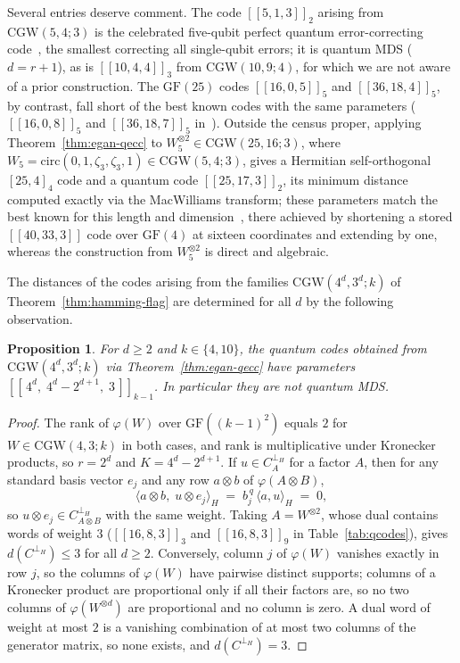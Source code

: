 \documentclass{article}
\newtheorem{proposition}[theorem]{Proposition}
\theoremstyle{definition}
\theoremstyle{remark}
\newcommand{\CGW}{\mathrm{CGW}}
\newcommand{\GF}{\mathrm{GF}}
\begin{document}
Several entries deserve comment.  The code $[[5,1,3]]_2$ arising from
$\CGW(5,4;3)$ is the celebrated five-qubit perfect quantum
error-correcting code~\cite{CGW-Survey}, the smallest correcting all
single-qubit errors; it is quantum MDS ($d = r+1$), as is $[[10,4,4]]_3$
from $\CGW(10,9;4)$, for which we are not aware of a prior construction.
The $\GF(25)$ codes $[[16,0,5]]_5$ and $[[36,18,4]]_5$, by contrast, fall
short of the best known codes with the same parameters ($[[16,0,8]]_5$ and
$[[36,18,7]]_5$ in~\cite{Grassl:codetables}).  Outside the census proper,
applying Theorem~\ref{thm:egan-qecc} to
$W_5^{\otimes 2} \in \CGW(25,16;3)$, where
$W_5 = \mathrm{circ}(0,1,\zeta_3,\zeta_3,1) \in \CGW(5,4;3)$, gives a
Hermitian self-orthogonal $[25,4]_4$ code and a quantum code
$[[25,17,3]]_2$, its minimum distance computed exactly via the MacWilliams
transform; these parameters match the best known for this length and
dimension~\cite{Grassl:codetables}, there achieved by shortening a stored
$[[40,33,3]]$ code over $\mathrm{GF}(4)$ at sixteen coordinates and
extending by one, whereas the construction from $W_5^{\otimes 2}$ is direct
and algebraic.

The distances of the codes arising from the families $\CGW(4^d,3^d;k)$ of
Theorem~\ref{thm:hamming-flag} are determined for all $d$ by the following
observation.

\begin{proposition}\label{prop:family-distance}
For $d \geq 2$ and $k \in \{4, 10\}$, the quantum codes obtained from
$\CGW(4^d, 3^d; k)$ via Theorem~\ref{thm:egan-qecc} have parameters
$[[\,4^d,\; 4^d - 2^{d+1},\; 3\,]]_{k-1}$.  In particular they are not quantum MDS.
\end{proposition}

\begin{proof}
The rank of $\varphi(W)$ over $\GF((k-1)^2)$ equals $2$ for $W \in \CGW(4,3;k)$
in both cases, and rank is multiplicative under Kronecker products, so
$r = 2^d$ and $K = 4^d - 2^{d+1}$.
If $u \in C_A^{\perp_H}$ for a factor $A$, then for any standard basis vector
$e_j$ and any row $a \otimes b$ of $\varphi(A \otimes B)$,
\[
\langle a \otimes b,\; u \otimes e_j \rangle_H
  \;=\; b_j^{\,q}\,\langle a, u \rangle_H \;=\; 0,
\]
so $u \otimes e_j \in C_{A \otimes B}^{\perp_H}$ with the same weight.  Taking
$A = W^{\otimes 2}$, whose dual contains words of weight $3$
($[[16,8,3]]_3$ and $[[16,8,3]]_9$ in Table~\ref{tab:qcodes}), gives
$d(C^{\perp_H}) \leq 3$ for all $d \geq 2$.  Conversely, column $j$ of
$\varphi(W)$ vanishes exactly in row $j$, so the columns of $\varphi(W)$ have
pairwise distinct supports; columns of a Kronecker product are proportional
only if all their factors are, so no two columns of $\varphi(W^{\otimes d})$
are proportional and no column is zero.  A dual word of weight at most $2$ is
a vanishing combination of at most two columns of the generator matrix, so
none exists, and $d(C^{\perp_H}) = 3$.
\end{proof}
\end{document}
